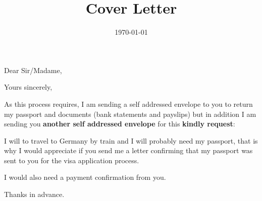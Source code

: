 \documentclass[11pt,a4paper,sans]{moderncv} %
\title{Cover Letter}
\begin{document}


\clearpage

\date{\today} %
\opening{Dear Sir/Madame,} %
\closing{Yours sincerely,} %


\makelettertitle %

As this process requires, I am sending a self addressed envelope to you to return my passport and documents (bank statements and payslips) but in addition I am sending you \textbf{another self addressed envelope} for this \textbf{kindly request}:

I will to travel to Germany by train and I will probably need my passport, that is why I would appreciate if you send me a letter confirming that my passport was sent to you for the visa application process.

I would also need a payment confirmation from you.

Thanks in advance.





\makeletterclosing %

\end{document}
